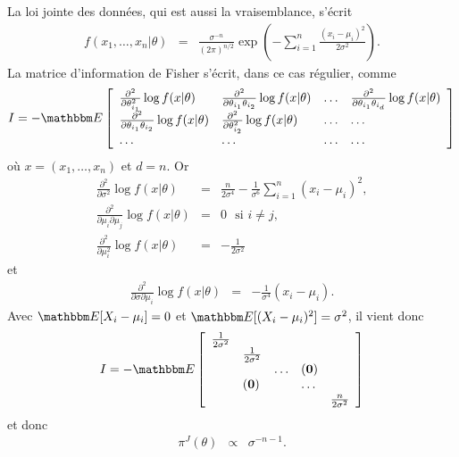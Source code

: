 \begin{rep} %
La loi jointe des données, qui est aussi la vraisemblance, s'écrit 
\begin{eqnarray}
f(x_1,\ldots,x_n| \theta) & = & \frac{\sigma^{-n}}{(2\pi)^{n/2}} \exp\left(-\sum\limits_{i=1}^n \frac{(x_i-\mu_i)^2}{2\sigma^2}\right). \label{vraistoto}
\end{eqnarray}
La matrice d'information de Fisher s'écrit, dans ce cas régulier, comme 
$$
I=-\E\left[\begin{array}{llll}
\frac{\partial^2}{\partial \theta^2_{i_1}} \log f(x | \theta) & \frac{\partial^2}{\partial \theta_{i_1}\theta_{i_2}} \log f(x | \theta) & \ldots & \frac{\partial^2}{\partial \theta_{i_1}\theta_{i_d}} \log f(x | \theta) \\
\frac{\partial^2}{\partial \theta_{i_1}\theta_{i_2}} \log f(x | \theta) & \frac{\partial^2}{\partial \theta^2_{i_2}} \log f(x | \theta) & \ldots & \ldots \\
\ldots & \ldots & \ldots & \ldots 
\end{array}\right]
$$
où $x=(x_1,\ldots,x_n)$ et $d=n$. Or
\begin{eqnarray*}
\frac{\partial^2}{\partial \sigma^2} \log f(x | \theta) & = & \frac{n}{2\sigma^4} - \frac{1}{\sigma^6}\sum\limits_{i=1}^n (x_i-\mu_i)^2, \\
\frac{\partial^2}{\partial \mu_i \partial \mu_j} \log f(x | \theta) & = & 0 \ \ \ \text{si $i\neq j$,} \\
\frac{\partial^2}{\partial \mu^2_i} \log f(x | \theta) & = & -\frac{1}{2\sigma^2}
\end{eqnarray*}
et
\begin{eqnarray*}
\frac{\partial^2}{\partial \sigma \partial \mu_i }\log f(x | \theta) & = & -\frac{1}{\sigma^4} (x_i-\mu_i).
\end{eqnarray*}
Avec $\E[X_i-\mu_i]=0$ et $\E[(X_i-\mu_i)^2]=\sigma^2$, il vient donc
$$
I=-\E\left[\begin{array}{lllll}
\frac{1}{2\sigma^2} & \\
&  \frac{1}{2\sigma^2}  & \\
&&  \ldots & {\bf (0)} \\
& {\bf (0)} && \ldots & \\
&&&& \frac{n}{2\sigma^2} 
\end{array}\right]
$$
et donc
\begin{eqnarray*}
\pi^J(\theta) & \propto & \sigma^{-n-1}.
\end{eqnarray*}
\end{rep}

